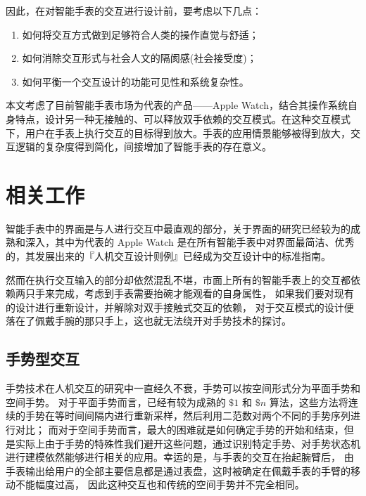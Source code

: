 因此，在对智能手表的交互进行设计前，要考虑以下几点：

\begin{enumerate}
    \kaishu
    \item 如何将交互方式做到足够符合人类的操作直觉与舒适；
    \item 如何消除交互形式与社会人文的隔阂感(社会接受度)；
    \item 如何平衡一个交互设计的功能可见性和系统复杂性。
\end{enumerate}

本文考虑了目前智能手表市场为代表的产品——Apple Watch，结合其操作系统自身特点，设计另一种无接触的、可以释放双手依赖的交互模式。在这种交互模式下，用户在手表上执行交互的目标得到放大。手表的应用情景能够被得到放大，交互逻辑的复杂度得到简化，间接增加了智能手表的存在意义。

\section{相关工作}

智能手表中的界面是与人进行交互中最直观的部分\cite{liuheng2015}，关于界面的研究已经较为的成熟和深入\cite{chengshiwei2009,fuaiming2006}，其中为代表的 Apple Watch 是在所有智能手表中对界面最简洁、优秀的，其发展出来的『人机交互设计则例』\cite{WatchGuidelines:2016}已经成为交互设计中的标准指南。

然而在执行交互输入的部分却依然混乱不堪，市面上所有的智能手表上的交互都依赖两只手来完成，考虑到手表需要抬碗才能观看的自身属性，
如果我们要对现有的设计进行重新设计，并解除对双手接触式交互的依赖，
对于交互模式的设计便落在了佩戴手腕的那只手上，这也就无法绕开对手势技术的探讨。

\subsection{手势型交互}

手势技术在人机交互的研究中一直经久不衰，手势可以按空间形式分为平面手势和空间手势。
对于平面手势而言，已经有较为成熟的 $\$1$ \cite{wobbrock2007gestures}
和 $\$n$ \cite{anthony2010lightweight}算法，这些方法将连续的手势在等时间间隔内进行重新采样，然后利用二范数对两个不同的手势序列进行对比；
而对于空间手势而言，最大的困难就是如何确定手势的开始和结束，但是实际上由于手势的特殊性我们避开这些问题，通过识别特定手势、对手势状态机进行建模依然能够进行相关的应用\cite{liuqingshui2002,chenyaxi2014,dihaijin2011,houwenjun2015,Vatavu:2014:LGT:2602299.2602316}。幸运的是，与手表的交互在抬起腕臂后，
由手表输出给用户的全部主要信息都是通过表盘，这时被确定在佩戴手表的手臂的移动不能幅度过高，
因此这种交互也和传统的空间手势并不完全相同。

